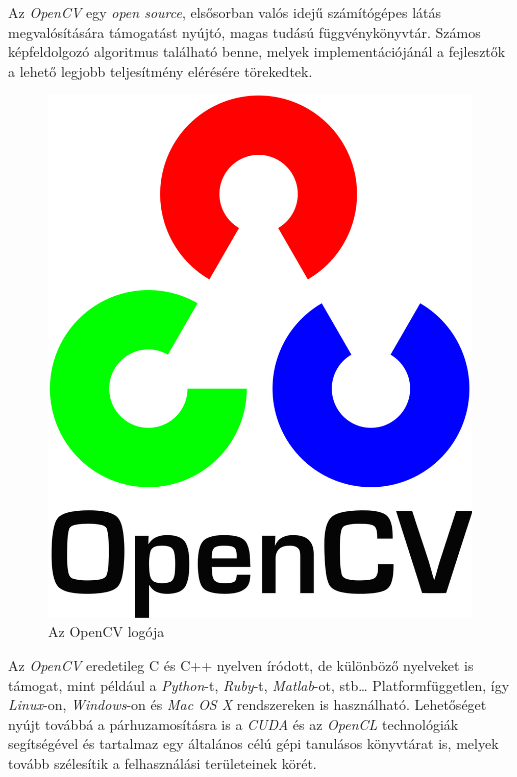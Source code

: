 


Az \textit{OpenCV} egy \textit{open source}, elsősorban valós idejű számítógépes látás megvalósítására támogatást nyújtó, magas tudású függvénykönyvtár. Számos képfeldolgozó algoritmus található benne, melyek implementációjánál a fejlesztők a lehető legjobb teljesítmény elérésére törekedtek.

\begin{figure}[h]
\centering
\includegraphics[width=2.4truecm, height=2.96truecm]{images/OpenCV-logo.png}
\caption{Az OpenCV logója}
\label{fig:opencv}
\end{figure}

Az \textit{OpenCV} eredetileg C és C++ nyelven íródott, de különböző nyelveket is támogat, mint például a \textit{Python}-t, \textit{Ruby}-t, \textit{Matlab}-ot, stb\ldots
Platformfüggetlen, így \textit{Linux}-on, \textit{Windows}-on és \textit{Mac OS X} rendszereken is használható. Lehetőséget nyújt továbbá a párhuzamosításra is a \textit{CUDA} és az \textit{OpenCL} technológiák segítségével és tartalmaz egy általános célú gépi tanulásos könyvtárat is, melyek tovább szélesítik a felhasználási területeinek körét. \cite{bradski2008learning}


